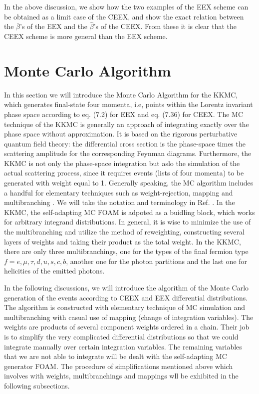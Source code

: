 In the above discussion, we show how the two examples of the EEX scheme can be obtained as a limit case of the CEEX, and show the exact relation between the $\bar{\beta}$'s of the EEX and the $\hat{\beta}$'s of the CEEX. From these it is clear that the CEEX scheme is more general than the EEX scheme.
\newpage
\section{Monte Carlo Algorithm}
In this section we will introduce the Monte Carlo Algorithm for the KKMC, which generates final-state four momenta, i.e, points within the Lorentz invariant phase space according to eq. (7.2) for EEX and eq. (7.36) for CEEX. The MC technique of  the KKMC is generally an approach of integrating exactly over the phase space without approximation. It is based on the rigorous perturbative quantum field theory: the differential cross section  is the phase-space times the scattering amplitude for the corresponding Feynman diagrams. Furthermore, the KKMC is not only the phase-space integration but aslo the simulation of the actual scattering process, since it requires events (lists of four momenta) to be generated with weight equal to 1. Generally speaking, the MC algorithm includes a handful for elementary techniques such as weight-rejection, mapping and multibranching \cite{PracMC}. We will take the notation and terminology in Ref. \cite{PracMC}. In the KKMC, the self-adapting MC FOAM \cite{FOAM} is adpoted as a buidling block, which works for arbitrary integrand distributions. In general, it is wise to minimize the use of the multibranching and utilize the method of reweighting, constructing several layers of weights and taking their product as the total weight. In the KKMC, there are only three multibranchings, one for the types of the final fermion type $f=e,\mu,\tau,d,u,s,c,b$, another one for the photon partitions and the last one for helicities of the emitted photons. 

In the following discussions, we will introduce the algorithm of the Monte Carlo generation of the events according to CEEX and EEX differential distributions. The algorithm is constructed with elementary technique of MC simulation and multibranching with casual use of mapping (change of integration variables). The weights are products of several component weights ordered in a chain. Their job is to simplify the very complicated differential distributions so that we could integrate manually over certain integration variables. The remaining variables that we are not able to integrate will be dealt with the self-adapting MC generator FOAM. The procedure of simplifications mentioned above which involves with weights, multibranchings and mappings wll be exhibited in the following subsections. 

